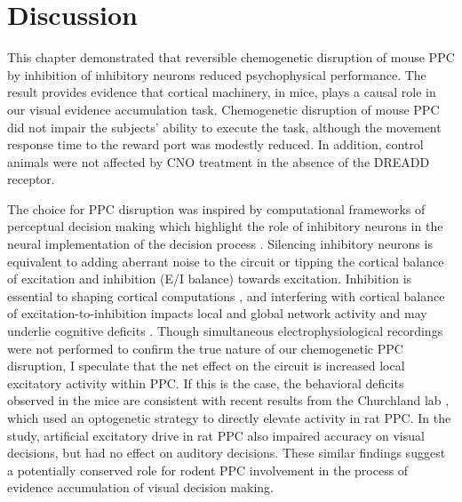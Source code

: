 \section{Discussion}
This chapter demonstrated that reversible chemogenetic disruption of mouse PPC by inhibition of inhibitory neurons reduced psychophysical performance. The result provides evidence that cortical machinery, in mice, plays a causal role in our visual evidence accumulation task. Chemogenetic disruption of mouse PPC did not impair the subjects' ability to execute the task, although the movement response time to the reward port was modestly reduced. In addition, control animals were not affected by CNO treatment in the absence of the DREADD receptor.\par 
The choice for PPC disruption was inspired by computational frameworks of perceptual decision making which highlight the role of inhibitory neurons in the neural implementation of the decision process \parencite{Beck2008,Wang2002}. Silencing inhibitory neurons is equivalent to adding aberrant noise to the circuit or tipping the cortical balance of excitation and inhibition (E/I balance) towards excitation. Inhibition is essential to shaping cortical computations \parencite{Haider2006,Haider2012,Isaacson2011}, and interfering with cortical balance of excitation-to-inhibition impacts local and global network activity and may underlie cognitive deficits \parencite{Markram2010,Rubenstein2010,Rubenstein2003,Yizhar2011}. Though simultaneous electrophysiological recordings were not performed to confirm the true nature of our chemogenetic PPC disruption, I speculate that the net effect on the circuit is increased local excitatory activity within PPC. If this is the case, the behavioral deficits observed in the mice are consistent with recent results from the Churchland lab \parencite{Licata2017}, which used an optogenetic strategy to directly elevate activity in rat PPC. In the \textcite{Licata2017} study, artificial excitatory drive in rat PPC also impaired accuracy on visual decisions, but had no effect on auditory decisions. These similar findings suggest a potentially conserved role for rodent PPC involvement in the process of evidence accumulation of visual decision making. 



